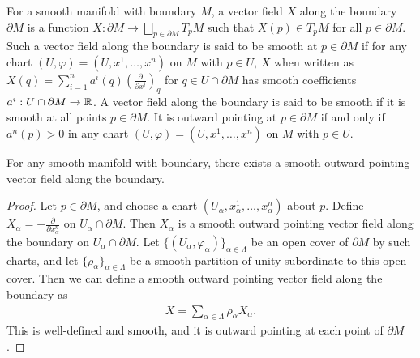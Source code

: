 \begin{definition}
    For a smooth manifold with boundary $M$, a vector field $X$ along the boundary $\partial M$ is a function $X:\partial M \to \bigsqcup_{p \in \partial M} T_{p}M$ such that $X(p) \in T_{p}M$ for all $p \in \partial M$. Such a vector field along the boundary is said to be smooth at $p \in \partial M$ if for any chart $(U,\varphi) = (U,x^{1},\ldots,x^{n})$ on $M$ with $p \in U$, $X$ when written as $X(q) = \sum_{i=1}^{n} a^{i}(q)(\frac{\partial}{\partial x^{i}})_{q}$ for $q \in U \cap \partial M$ has smooth coefficients $a^{i}:U \cap \partial M \to \mathbb{R}$. A vector field along the boundary is said to be smooth if it is smooth at all points $p \in \partial M$. It is outward pointing at $p \in \partial M$ if and only if $a^{n}(p) > 0$ in any chart $(U,\varphi) = (U,x^{1},\ldots,x^{n})$ on $M$ with $p \in U$. 
\end{definition}

\begin{proposition}
    For any smooth manifold with boundary, there exists a smooth outward pointing vector field along the boundary.
\end{proposition}
\begin{proof}
    Let $p \in \partial M$, and choose a chart $(U_{\alpha},x_{\alpha}^{1},\ldots,x_{\alpha}^{n})$ about $p$. Define $X_{\alpha} = -\frac{\partial}{\partial x_{\alpha}^{n}}$ on $U_{\alpha} \cap \partial M$. Then $X_{\alpha}$ is a smooth outward pointing vector field along the boundary on $U_{\alpha} \cap \partial M$. Let $\{(U_{\alpha},\varphi_{\alpha})\}_{\alpha \in \Lambda}$ be an open cover of $\partial M$ by such charts, and let $\{\rho_{\alpha}\}_{\alpha \in \Lambda}$ be a smooth partition of unity subordinate to this open cover. Then we can define a smooth outward pointing vector field along the boundary as
    \begin{align}
        X = \sum_{\alpha \in \Lambda} \rho_{\alpha} X_{\alpha}.
    \end{align}
    This is well-defined and smooth, and it is outward pointing at each point of $\partial M$.
\end{proof}

